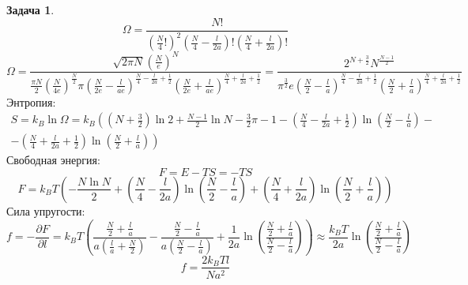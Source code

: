 \documentclass[12pt]{article}
\theoremstyle{definition}
\newtheorem{zad}{Задача}[section]
\begin{document}
\begin{zad}
\begin{equation}
    \Omega=\frac{N!}{(\frac{N}{4}!)^2(\frac{N}{4}-\frac{l}{2a})!(\frac{N}{4}+\frac{l}{2a})!}
\end{equation}
\begin{equation*}
    \Omega=\frac{\sqrt{2\pi N}\left(\frac{N}{e}\right)^N}{\frac{\pi N}{2}\left(\frac{N}{4e}\right)^{\frac{N}{2}}\pi\left(\frac{N}{2e}-\frac{l}{ae}\right)^{\frac{N}{4}-\frac{l}{2a}+\frac{1}{2}}\left(\frac{N}{2e}+\frac{l}{ae}\right)^{\frac{N}{4}+\frac{l}{2a}+\frac{1}{2}}}=\frac{2^{N+\frac{3}{2}}N^{\frac{N-1}{2}}}{\pi^\frac{3}{2}e\left(\frac{N}{2}-\frac{l}{a}\right)^{\frac{N}{4}-\frac{l}{2a}+\frac{1}{2}}\left(\frac{N}{2}+\frac{l}{a}\right)^{\frac{N}{4}+\frac{l}{2a}+\frac{1}{2}}}
\end{equation*}
Энтропия:
\begin{multline}
    S=k_B\ln\Omega=k_B\left(\left(N+\frac{3}{2}\right)\ln 2+\frac{N-1}{2}\ln N-\frac{3}{2}\pi-1-\left(\frac{N}{4}-\frac{l}{2a}+\frac{1}{2}\right)\ln\left(\frac{N}{2}-\frac{l}{a}\right)\right.-\\-\left.\left(\frac{N}{4}+\frac{l}{2a}+\frac{1}{2}\right)\ln\left(\frac{N}{2}+\frac{l}{a}\right)\right)
\end{multline}
Свободная энергия:
\begin{equation}
    F=E-TS=-TS
\end{equation}
\begin{equation}
    \boxed{F=k_BT\left(-\frac{N\ln N}{2}+\left(\frac{N}{4}-\frac{l}{2a}\right)\ln\left(\frac{N}{2}-\frac{l}{a}\right)+\left(\frac{N}{4}+\frac{l}{2a}\right)\ln\left(\frac{N}{2}+\frac{l}{a}\right)\right)}
\end{equation}
Сила упругости:
\begin{equation}
    f=-\frac{\partial F}{\partial l}=k_BT\left(\frac{\frac{N}{2}+\frac{l}{a}}{a(\frac{l}{a}+\frac{N}{2})}-\frac{\frac{N}{2}-\frac{l}{a}}{a(\frac{N}{2}-\frac{l}{a})}+\frac{1}{2a}\ln\left(\frac{\frac{N}{2}+\frac{l}{a}}{\frac{N}{2}-\frac{l}{a}}\right)\right)\approx \frac{k_BT}{2a}\ln\left(\frac{\frac{N}{2}+\frac{l}{a}}{\frac{N}{2}-\frac{l}{a}}\right)
\end{equation}
\begin{equation}
    \boxed{f=\frac{2k_BTl}{Na^2}}
\end{equation}
\end{zad}
\end{document}
